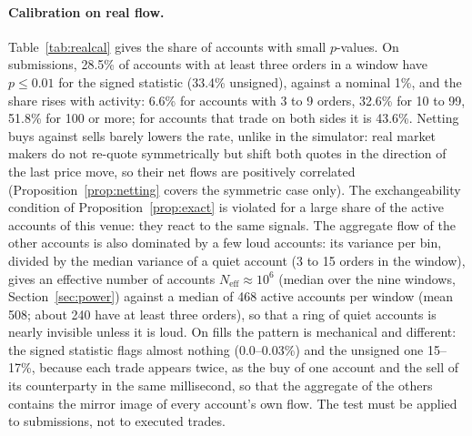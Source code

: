 \paragraph{Calibration on real flow.} Table~\ref{tab:realcal} gives the share of accounts with small $p$-values. On submissions, 28.5\% of accounts with at least three orders in a window have $p\le0.01$ for the signed statistic (33.4\% unsigned), against a nominal 1\%, and the share rises with activity: 6.6\% for accounts with 3 to 9 orders, 32.6\% for 10 to 99, 51.8\% for 100 or more; for accounts that trade on both sides it is 43.6\%. Netting buys against sells barely lowers the rate, unlike in the simulator: real market makers do not re-quote symmetrically but shift both quotes in the direction of the last price move, so their net flows are positively correlated (Proposition~\ref{prop:netting} covers the symmetric case only). The exchangeability condition of Proposition~\ref{prop:exact} is violated for a large share of the active accounts of this venue: they react to the same signals. The aggregate flow of the other accounts is also dominated by a few loud accounts: its variance per bin, divided by the median variance of a quiet account (3 to 15 orders in the window), gives an effective number of accounts $N_{\mathrm{eff}}\approx10^6$ (median over the nine windows, Section~\ref{sec:power}) against a median of 468 active accounts per window (mean 508; about 240 have at least three orders), so that a ring of quiet accounts is nearly invisible unless it is loud. On fills the pattern is mechanical and different: the signed statistic flags almost nothing (0.0--0.03\%) and the unsigned one 15--17\%, because each trade appears twice, as the buy of one account and the sell of its counterparty in the same millisecond, so that the aggregate of the others contains the mirror image of every account's own flow. The test must be applied to submissions, not to executed trades.

\begin{table}[t]
\centering\footnotesize
{}
\caption{Share of accounts flagged on real account-level flow (accounts with at least three records in the window). Under the null of Proposition~\ref{prop:exact} the share would be at most the level}\label{tab:realcal}
\end{table}

